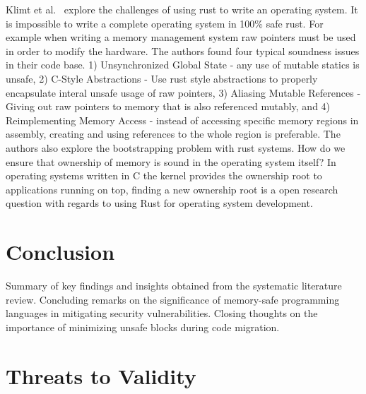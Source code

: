 \documentclass[sigconf]{acmart}
\begin{document}
Klimt et al.~\cite{Klimt2023-ob} explore the challenges of using rust to write an operating
system. It is impossible to write a complete operating system in 100\% safe rust. For example when
writing a memory management system raw pointers must be used in order to modify the hardware. The
authors found four typical soundness issues in their code base. 1) Unsynchronized Global State - any
use of mutable statics is unsafe, 2) C-Style Abstractions - Use rust style abstractions to properly
encapsulate interal unsafe usage of raw pointers, 3) Aliasing Mutable References - Giving out raw
pointers to memory that is also referenced mutably, and 4) Reimplementing Memory Access - instead of
accessing specific memory regions in assembly, creating and using references to the whole region is
preferable. The authors also explore the bootstrapping problem with rust systems. How do we ensure
that ownership of memory is sound in the operating system itself? In operating systems written in C
the kernel provides the ownership root to applications running on top, finding a new ownership root
is a open research question with regards to using Rust for operating system development.







\section{Conclusion}

Summary of key findings and insights obtained from the systematic literature review.
Concluding remarks on the significance of memory-safe programming languages in mitigating security vulnerabilities.
Closing thoughts on the importance of minimizing unsafe blocks during code migration.

\section{Threats to Validity}
\balance



\end{document}
